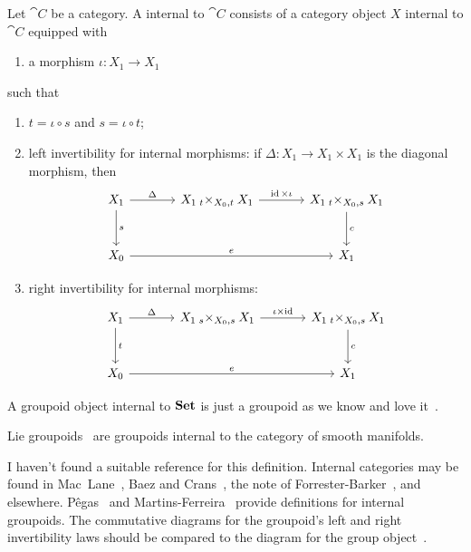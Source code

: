 \begin{node}
\begin{definition}\label{internal-0002}%
Let $\cat{C}$ be a category. A  internal to
$\cat{C}$ consists of a category object $X$ internal to $\cat{C}$
equipped with
\begin{enumerate}
\item a morphism $\iota\colon X_{1}\to X_{1}$
\end{enumerate}
such that
\begin{enumerate}
\item $t=\iota\circ s$ and $s=\iota\circ t$;
\item left invertibility for internal morphisms: if $\Delta\colon X_{1}\to X_{1}\times X_{1}$ is the diagonal
  morphism, then
\begin{equation*}
\begin{tikzcd}[sep=large]
  X_{1} \ar[d,"s"] \ar[r,"\Delta"] & X_{1}\mathbin{{}_{t}\times_{X_{0},t}}X_{1} \ar[r,"\id\times\iota"]&\ar[d,"c"]X_{1}\mathbin{{}_{t}\times_{X_{0},s}}X_{1}\\
X_{0} \ar[rr,"e"] & & X_{1}
\end{tikzcd}
\end{equation*}
\item right invertibility for internal morphisms:
\begin{equation*}
\begin{tikzcd}[sep=large]
  X_{1} \ar[d,"t"] \ar[r,"\Delta"] & X_{1}\mathbin{{}_{s}\times_{X_{0},s}}X_{1} \ar[r,"\iota\times\id"]&\ar[d,"c"]X_{1}\mathbin{{}_{t}\times_{X_{0},s}}X_{1}\\
X_{0} \ar[rr,"e"] & & X_{1}
\end{tikzcd}
\end{equation*}
\end{enumerate}

\begin{node}[Example]\label{internal-0005}%
A groupoid object internal to $\mathbf{Set}$ is just a groupoid as we know and
love it~.
\end{node}
\begin{node}[Example]\label{internal-0006}%
Lie groupoids~ are groupoids internal to the category of
smooth manifolds.
\end{node}
\end{definition}

\begin{node}[References]\label{internal-0003}%
I haven't found a suitable reference for this definition. Internal
categories may be found in Mac~Lane~\cite[XII\S1]{mac1998categories}, Baez and Crans~\cite[\S2]{baez2010higherdimensional},
the note of Forrester-Barker~\cite{forresterbarker2002group}, and elsewhere.
P\^{e}gas~\cite{pegas2013groupoids} and
Martins-Ferreira~\cite{martinsferreira2022internal} provide definitions
for internal groupoids. The commutative diagrams for the groupoid's left
and right invertibility laws should be compared to the diagram for the
group object~.
\end{node}
\end{node}
